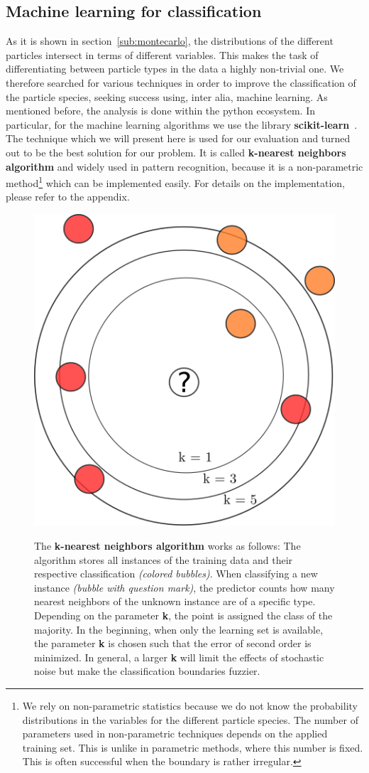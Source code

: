 \clearpage

\subsection{Machine learning for classification}
As it is shown in section~\ref{sub:montecarlo},
the distributions of the different particles intersect in terms of different
variables. This makes the task of differentiating between particle types in the 
data a highly non-trivial one. We therefore searched for various techniques in order
to improve the classification of the particle species, seeking success using, inter alia, machine learning. 
As mentioned before, the analysis is done within the python
ecosystem. In particular, for the machine learning algorithms we use the library 
\textbf{scikit-learn}~\cite{scikit-learn}. 
The technique which we will present
here is used for our evaluation and turned out to be the best solution for our problem.
It is called \textbf{k-nearest neighbors algorithm} and
widely used in pattern recognition, because it is a non-parametric method\footnote{
We rely on non-parametric statistics because we do not know the probability distributions 
in the variables for the different particle species.
The number of parameters used in non-parametric techniques depends on the applied training set. 
This is unlike in parametric methods, where this number is fixed. This is often successful when the boundary is rather irregular.} 
which can be implemented easily. For details on the implementation, please refer to the appendix.
\begin{figure}
    \centering
    \caption{The \textbf{k-nearest neighbors algorithm} works as follows: 
        The algorithm stores all instances of the training data and their respective
    classification \textit{(colored bubbles)}. When classifying a new instance \textit{(bubble with question mark)}, the 
    predictor counts how many nearest neighbors of the unknown instance are of a specific type. 
    Depending on the parameter \textbf{k}, the point is assigned the class of the majority. 
    In the beginning, when only the learning set is available,
    the parameter \textbf{k} is chosen such that the error of second order is minimized. In general, a larger \textbf{k} will
    limit the effects of stochastic noise but make the classification boundaries fuzzier.}
    \includegraphics[width=0.5\linewidth]{figures/knn_schema}
\label{fig:knn_schema}
\end{figure}

